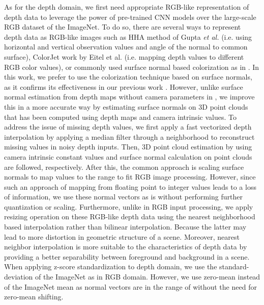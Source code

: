 \documentclass[10pt,journal,compsoc]{IEEEtran}
\begin{document}
As for the depth domain, we first need appropriate RGB-like representation of depth data to leverage the power of pre-trained CNN models over the large-scale RGB dataset of the ImageNet. To do so, there are several ways to represent depth data as RGB-like images such as HHA method of Gupta \textit{et al.} \cite{Gupta_ECCV_2014} (i.e. using horizontal and vertical observation values and angle of the normal to common surface), ColorJet work by Eitel et al. \cite{Eitel_IROS_2015} (i.e. mapping depth values to different RGB color values), or commonly used surface normal based colorization as in \cite{Bo_IROS_2011, Caglayan_ECCVW_2018}. In this work, we prefer to use the colorization technique based on surface normals, as it confirms its effectiveness in our previous work \cite{Caglayan_ECCVW_2018}. However, unlike surface normal estimation from depth maps without camera parameters in \cite{Caglayan_ECCVW_2018}, we improve this in a more accurate way by estimating surface normals on 3D point clouds that has been computed using depth maps and camera intrinsic values. To address the issue of missing depth values, we first apply a fast vectorized depth interpolation by applying a median filter through a  neighborhood to reconstruct missing values in noisy depth inputs. Then, 3D point cloud estimation by using camera intrinsic constant values and surface normal calculation on point clouds are followed, respectively. After this, the common approach is scaling surface normals to map values to the  range to fit RGB image processing. However, since such an approach of mapping from floating point to integer values leads to a loss of information, we use these normal vectors as is without performing further quantization or scaling. Furthermore, unlike in RGB input processing, we apply resizing operation on these RGB-like depth data using the nearest neighborhood based interpolation rather than bilinear interpolation. Because the latter may lead to more distortion in geometric structure of a scene. Moreover, nearest neighbor interpolation is more suitable to the characteristics of depth data by providing a better separability between foreground and background in a scene. When applying z-score standardization to depth domain, we use the standard-deviation of the ImageNet as in RGB domain. However, we use zero-mean instead of the ImageNet mean as normal vectors are in the range of  without the need for zero-mean shifting.
\end{document}
